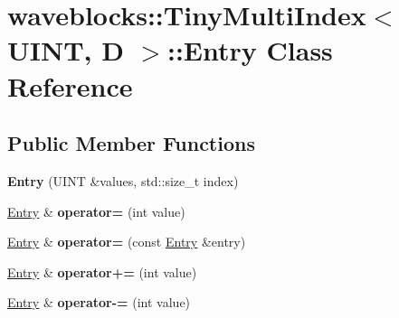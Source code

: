 \hypertarget{classwaveblocks_1_1_tiny_multi_index_1_1_entry}{}\section{waveblocks\+:\+:Tiny\+Multi\+Index$<$ U\+I\+N\+T, D $>$\+:\+:Entry Class Reference}
\label{classwaveblocks_1_1_tiny_multi_index_1_1_entry}
\subsection*{Public Member Functions}
\begin{DoxyCompactItemize}
\item 
\hypertarget{classwaveblocks_1_1_tiny_multi_index_1_1_entry_a002a54caf8cfe40a273f57c1859bf70b}{}{\bfseries Entry} (U\+I\+N\+T \&values, std\+::size\+\_\+t index)\label{classwaveblocks_1_1_tiny_multi_index_1_1_entry_a002a54caf8cfe40a273f57c1859bf70b}

\item 
\hypertarget{classwaveblocks_1_1_tiny_multi_index_1_1_entry_a6257e0f2542f2f22faad22ceee5f91a2}{}\hyperlink{classwaveblocks_1_1_tiny_multi_index_1_1_entry}{Entry} \& {\bfseries operator=} (int value)\label{classwaveblocks_1_1_tiny_multi_index_1_1_entry_a6257e0f2542f2f22faad22ceee5f91a2}

\item 
\hypertarget{classwaveblocks_1_1_tiny_multi_index_1_1_entry_a2b6a861952333c67c60f5a991a5fa025}{}\hyperlink{classwaveblocks_1_1_tiny_multi_index_1_1_entry}{Entry} \& {\bfseries operator=} (const \hyperlink{classwaveblocks_1_1_tiny_multi_index_1_1_entry}{Entry} \&entry)\label{classwaveblocks_1_1_tiny_multi_index_1_1_entry_a2b6a861952333c67c60f5a991a5fa025}

\item 
\hypertarget{classwaveblocks_1_1_tiny_multi_index_1_1_entry_ae154508fcec07e28ed6b2264762e3a9f}{}\hyperlink{classwaveblocks_1_1_tiny_multi_index_1_1_entry}{Entry} \& {\bfseries operator+=} (int value)\label{classwaveblocks_1_1_tiny_multi_index_1_1_entry_ae154508fcec07e28ed6b2264762e3a9f}

\item 
\hypertarget{classwaveblocks_1_1_tiny_multi_index_1_1_entry_a40fe0314c9b5436f8ff0ec61fefbd91b}{}\hyperlink{classwaveblocks_1_1_tiny_multi_index_1_1_entry}{Entry} \& {\bfseries operator-\/=} (int value)\label{classwaveblocks_1_1_tiny_multi_index_1_1_entry_a40fe0314c9b5436f8ff0ec61fefbd91b}


\end{DoxyCompactItemize}
